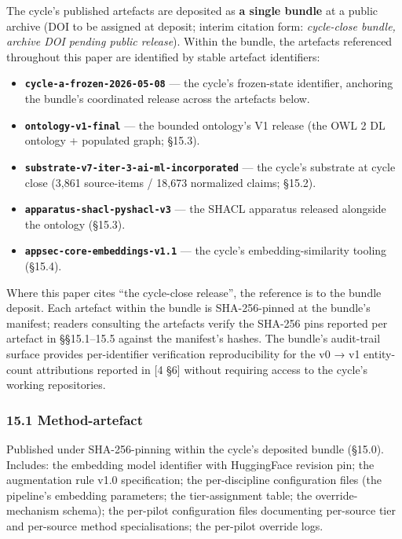 \documentclass[
]{article}
\providecommand{\tightlist}{%
  \setlength{\itemsep}{0pt}\setlength{\parskip}{0pt}}
\begin{document}
The cycle's published artefacts are deposited as \textbf{a single
bundle} at a public archive (DOI to be assigned at deposit; interim
citation form: \emph{cycle-close bundle, archive DOI pending public
release}). Within the bundle, the artefacts referenced throughout this
paper are identified by stable artefact identifiers:

\begin{itemize}
\tightlist
\item
  \textbf{\texttt{cycle-a-frozen-2026-05-08}} --- the cycle's
  frozen-state identifier, anchoring the bundle's coordinated release
  across the artefacts below.
\item
  \textbf{\texttt{ontology-v1-final}} --- the bounded ontology's V1
  release (the OWL 2 DL ontology + populated graph; §15.3).
\item
  \textbf{\texttt{substrate-v7-iter-3-ai-ml-incorporated}} --- the
  cycle's substrate at cycle close (3,861 source-items / 18,673
  normalized claims; §15.2).
\item
  \textbf{\texttt{apparatus-shacl-pyshacl-v3}} --- the SHACL apparatus
  released alongside the ontology (§15.3).
\item
  \textbf{\texttt{appsec-core-embeddings-v1.1}} --- the cycle's
  embedding-similarity tooling (§15.4).
\end{itemize}

Where this paper cites ``the cycle-close release'', the reference is to
the bundle deposit. Each artefact within the bundle is SHA-256-pinned at
the bundle's manifest; readers consulting the artefacts verify the
SHA-256 pins reported per artefact in §§15.1--15.5 against the
manifest's hashes. The bundle's audit-trail surface provides
per-identifier verification reproducibility for the v0 → v1 entity-count
attributions reported in {[}4 §6{]} without requiring access to the
cycle's working repositories.

\subsubsection{15.1 Method-artefact}\label{method-artefact}

Published under SHA-256-pinning within the cycle's deposited bundle
(§15.0). Includes: the embedding model identifier with HuggingFace
revision pin; the augmentation rule v1.0 specification; the
per-discipline configuration files (the pipeline's embedding parameters;
the tier-assignment table; the override-mechanism schema); the per-pilot
configuration files documenting per-source tier and per-source method
specialisations; the per-pilot override logs.
\end{document}
